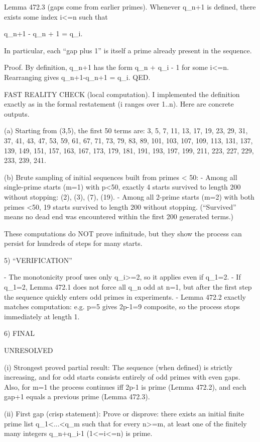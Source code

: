 Lemma 472.3 (gaps come from earlier primes).
Whenever q_{n+1} is defined, there exists some index i<=n such that

    q_{n+1} - q_n + 1 = q_i.

In particular, each “gap plus 1” is itself a prime already present in the sequence.

Proof.
By definition, q_{n+1} has the form q_n + q_i - 1 for some i<=n. Rearranging gives q_{n+1}-q_n+1 = q_i.  QED.

FAST REALITY CHECK (local computation).
I implemented the definition exactly as in the formal restatement (i ranges over 1..n). Here are concrete outputs.

(a) Starting from (3,5), the first 50 terms are:
3, 5, 7, 11, 13, 17, 19, 23, 29, 31, 37, 41, 43, 47, 53, 59, 61, 67, 71, 73, 79, 83, 89, 101, 103, 107, 109, 113, 131, 137, 139, 149, 151, 157, 163, 167, 173, 179, 181, 191, 193, 197, 199, 211, 223, 227, 229, 233, 239, 241.

(b) Brute sampling of initial sequences built from primes < 50:
- Among all single-prime starts (m=1) with p<50, exactly 4 starts survived to length 200 without stopping: (2), (3), (7), (19).
- Among all 2-prime starts (m=2) with both primes <50, 19 starts survived to length 200 without stopping.
(“Survived” means no dead end was encountered within the first 200 generated terms.)

These computations do NOT prove infinitude, but they show the process can persist for hundreds of steps for many starts.

5) “VERIFICATION”

- The monotonicity proof uses only q_i>=2, so it applies even if q_1=2.
- If q_1=2, Lemma 472.1 does not force all q_n odd at n=1, but after the first step the sequence quickly enters odd primes in experiments.
- Lemma 472.2 exactly matches computation: e.g. p=5 gives 2p-1=9 composite, so the process stops immediately at length 1.

6) FINAL

UNRESOLVED

(i) Strongest proved partial result:
The sequence (when defined) is strictly increasing, and for odd starts consists entirely of odd primes with even gaps. Also, for m=1 the process continues iff 2p-1 is prime (Lemma 472.2), and each gap+1 equals a previous prime (Lemma 472.3).

(ii) First gap (crisp statement):
Prove or disprove: there exists an initial finite prime list q_1<...<q_m such that for every n>=m, at least one of the finitely many integers q_n+q_i-1 (1<=i<=n) is prime.

